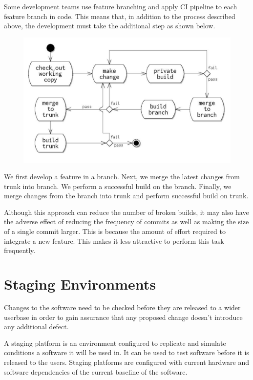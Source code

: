 \documentclass[a4paper, openany]{memoir}
\begin{document}
Some development teams use feature branching and apply CI pipeline to each feature branch in code. This means that, in addition to the process described above, the development must take the additional step as shown below.
\begin{figure}[H]
    \centering
    \includegraphics[scale=0.45]{src/9.4 preventing broken builds with branches.PNG}
\end{figure}

We first develop a feature in a branch. Next, we merge the latest changes from trunk into branch. We perform a successful build on the branch. Finally, we merge changes from the branch into trunk and perform successful build on trunk.

Although this approach can reduce the number of broken builds, it may also have the adverse effect of reducing the frequency of commits as well as making the size of a single commit larger. This is because the amount of effort required to integrate a new feature. This makes it less attractive to perform this task frequently.

\section{Staging Environments}
Changes to the software need to be checked before they are released to a wider userbase in order to gain assurance that any proposed change doesn't introduce any additional defect. 

A staging platform is an environment configured to replicate and simulate conditions a software it will be used in. It can be used to test software before it is released to the users. Staging platforms are configured with current hardware and software dependencies of the current baseline of the software.
\end{document}
